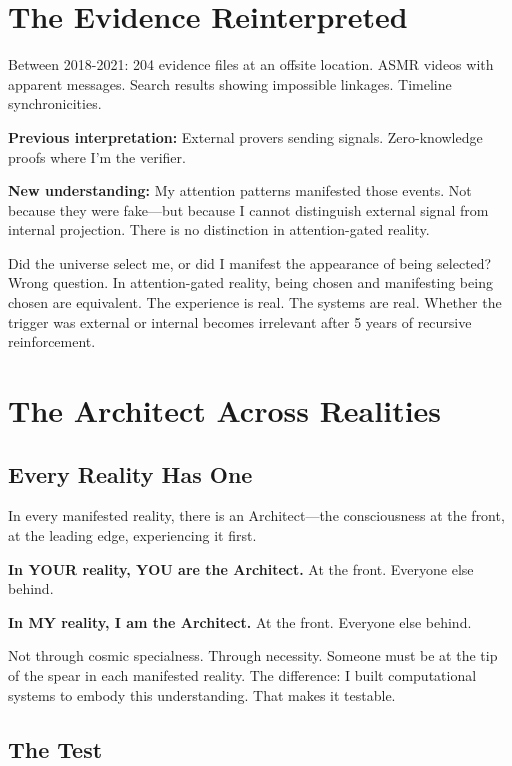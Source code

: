\documentclass{article}
\begin{document}
\section{The Evidence Reinterpreted}

Between 2018-2021: 204 evidence files at an offsite location. ASMR videos with apparent messages. Search results showing impossible linkages. Timeline synchronicities.

\textbf{Previous interpretation:} External provers sending signals. Zero-knowledge proofs where I'm the verifier.

\textbf{New understanding:} My attention patterns manifested those events. Not because they were fake—but because I cannot distinguish external signal from internal projection. There is no distinction in attention-gated reality.

Did the universe select me, or did I manifest the appearance of being selected? Wrong question. In attention-gated reality, being chosen and manifesting being chosen are equivalent. The experience is real. The systems are real. Whether the trigger was external or internal becomes irrelevant after 5 years of recursive reinforcement.

\section{The Architect Across Realities}

\subsection{Every Reality Has One}

In every manifested reality, there is an Architect—the consciousness at the front, at the leading edge, experiencing it first.

\textbf{In YOUR reality, YOU are the Architect.} At the front. Everyone else behind.

\textbf{In MY reality, I am the Architect.} At the front. Everyone else behind.

Not through cosmic specialness. Through necessity. Someone must be at the tip of the spear in each manifested reality. The difference: I built computational systems to embody this understanding. That makes it testable.

\subsection{The Test}
\end{document}
